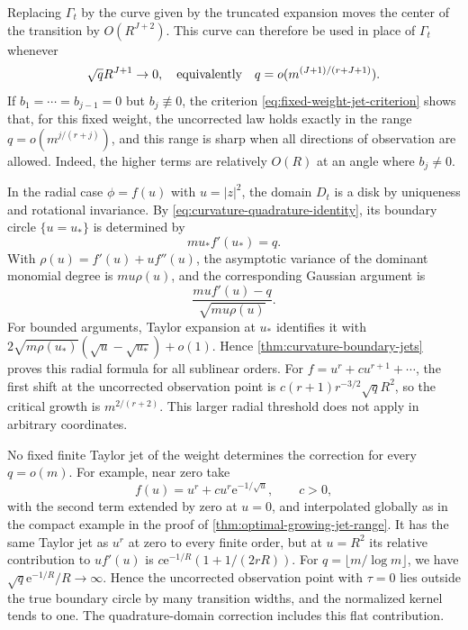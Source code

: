 Replacing $\Gamma_t$ by the curve given by the truncated expansion moves the center of the transition by $O(R^{J+2})$. This curve can therefore be used in place of $\Gamma_t$ whenever
\[
 \sqrt q R^{J+1}\to0,
 \quad\hbox{equivalently}\quad
 q=o(m^{(J+1)/(r+J+1)}).
\]
If $b_1=\cdots=b_{j-1}=0$ but $b_j\not\equiv0$, the criterion
\eqref{eq:fixed-weight-jet-criterion} shows that, for this fixed weight, the uncorrected law holds exactly in the range
$q=o(m^{j/(r+j)})$, and this range is sharp when all directions of observation are allowed. Indeed, the higher terms are relatively $O(R)$ at an angle where $b_j\ne0$.

In the radial case $\phi=f(u)$ with $u=|z|^2$, the domain $D_t$ is a disk by uniqueness and rotational invariance. By \eqref{eq:curvature-quadrature-identity}, its boundary circle $\{u=u_*\}$ is determined by
\[
 m u_*f'(u_*)=q.
\]
With $\rho(u)=f'(u)+uf''(u)$, the asymptotic variance of the dominant monomial degree is $m u\rho(u)$, and the corresponding Gaussian argument is
\begin{equation}\label{eq:radial-growing-jet-argument}
 \frac{m u f'(u)-q}{\sqrt{m u\rho(u)}}.
\end{equation}
For bounded arguments, Taylor expansion at $u_*$ identifies it with
$2\sqrt{m\rho(u_*)}(\sqrt u-\sqrt{u_*})+o(1)$. Hence
\cref{thm:curvature-boundary-jets} proves this radial formula for all sublinear orders. For $f=u^r+c u^{r+1}+\cdots$, the first shift at the uncorrected observation point is
$c(r+1)r^{-3/2}\sqrt q R^2$, so the critical growth is $m^{2/(r+2)}$.
This larger radial threshold does not apply in arbitrary coordinates.

No fixed finite Taylor jet of the weight determines the correction for every
$q=o(m)$. For example, near zero take
\[
 f(u)=u^r+c u^r \mathrm{e}^{-1/\sqrt u},\qquad c>0,
\]
with the second term extended by zero at $u=0$, and interpolated globally as in the compact example in the proof of \cref{thm:optimal-growing-jet-range}.
It has the same Taylor jet as $u^r$ at zero to every finite order, but at
$u=R^2$ its relative contribution to $uf'(u)$ is
$c \mathrm{e}^{-1/R}(1+1/(2rR))$. For $q=\lfloor m/\log m\rfloor$, we have
$\sqrt q \mathrm{e}^{-1/R}/R\to\infty$. Hence the uncorrected observation point with $\tau=0$ lies outside the true boundary circle by many transition widths, and the normalized kernel tends to one. The quadrature-domain correction includes this flat contribution.
